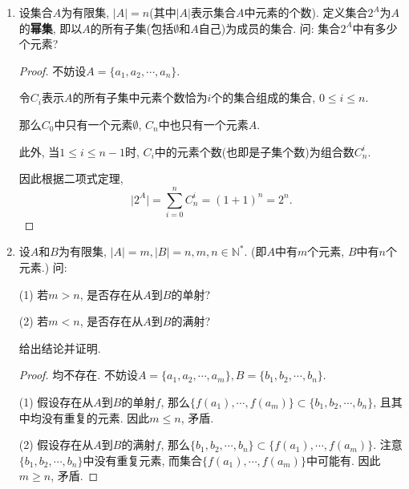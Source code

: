 \documentclass[UTF8,11pt, a4paper, oneside, fontset=none]{ctexbook}
\begin{document}
\begin{enumerate}
\begin{proof}
(b) 1. 先证明$(A \cup B)^c \subseteq A^c \cap B^c$. 设$x \in (A \cup B)^c$. 则$x \notin A \cup B$, 故$x \notin A$且$x \notin B$. 则$x \in A^c$ 且$ x \in B^c$, 故$x \in A^c \cap B^c$. 


再证明$A^c \cap B^c \subseteq (A \cup B)^c$. 设$x \in A^c \cap B^c$. 则$x \in A^c$且$x \in B^c$, 故$x \notin A$且$x \notin B$. 故$x \notin A \cup B$, 从而$x \in (A \cup B)^c$. 

结论2类似可证.



\end{proof}


\item 设集合$A$为有限集, $|A| = n$(其中$|A|$表示集合$A$中元素的个数). 定义集合$2^A$为$A$的{\bf 幂集}, 即以$A$的所有子集(包括$\emptyset$和$A$自己)为成员的集合. 问: 集合$2^A$中有多少个元素? 


\begin{proof}

不妨设$A = \{a_1, a_2, \cdots, a_n \}$. 


令$C_i$表示$A$的所有子集中元素个数恰为$i$个的集合组成的集合, $0 \leq i \leq n$.


那么$C_0$中只有一个元素$\emptyset$, $C_n$中也只有一个元素$A$. 

此外, 当$1 \leq i \leq n-1$时, $C_i$中的元素个数(也即是子集个数)为组合数$C_n^i$.

因此根据二项式定理, 
\[
\Big| 2^A \Big| = \sum_{i=0}^n C_n^i = (1 + 1)^n = 2^n.
\]

\end{proof}


\item 设$A$和$B$为有限集, $|A| =m, |B| =n, m, n \in \mathbb N^*$. (即$A$中有$m$个元素, $B$中有$n$个元素.) 问: 

(1) 若$m>n$, 是否存在从$A$到$B$的单射?

(2) 若$m < n$, 是否存在从$A$到$B$的满射?

给出结论并证明. 


\begin{proof}

均不存在. 不妨设$A = \{a_1, a_2, \cdots, a_m \}, B = \{ b_1, b_2, \cdots, b_n \}$.


(1) 假设存在从$A$到$B$的单射$f$, 那么$\{ f(a_1), \cdots, f(a_m) \} \subset \{ b_1, b_2, \cdots, b_n \}$, 且其中均没有重复的元素. 因此$m \leq n$, 矛盾.

(2) 假设存在从$A$到$B$的满射$f$, 那么$\{ b_1, b_2, \cdots, b_n \} \subset \{ f(a_1), \cdots, f(a_m) \}$. 注意$\{ b_1, b_2, \cdots, b_n \}$中没有重复元素, 而集合$\{ f(a_1), \cdots, f(a_m) \}$中可能有. 因此$m \geq n$, 矛盾.



\end{proof}
\end{enumerate}
\end{document}
